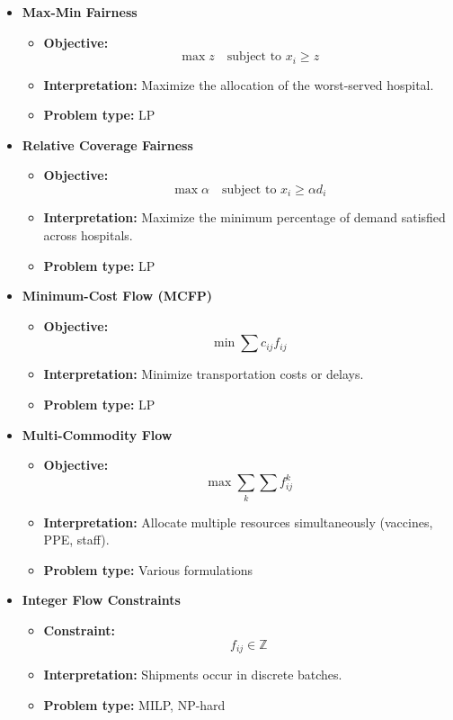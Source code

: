\documentclass[12pt, openany]{article}
\begin{document}
\begin{itemize}
\item \textbf{Max-Min Fairness}
\begin{itemize}
\item \textbf{Objective:}
\[
\max z \quad \text{subject to } x_i \ge z
\]
\item \textbf{Interpretation:} Maximize the allocation of the worst-served hospital.
\item \textbf{Problem type:} LP
\end{itemize}

\item \textbf{Relative Coverage Fairness}
\begin{itemize}
\item \textbf{Objective:}
\[
\max \alpha \quad \text{subject to } x_i \ge \alpha d_i
\]
\item \textbf{Interpretation:} Maximize the minimum percentage of demand satisfied across hospitals.
\item \textbf{Problem type:} LP
\end{itemize}

\item \textbf{Minimum-Cost Flow (MCFP)}
\begin{itemize}
\item \textbf{Objective:}
\[
\min \sum c_{ij} f_{ij}
\]
\item \textbf{Interpretation:} Minimize transportation costs or delays.
\item \textbf{Problem type:} LP
\end{itemize}

\item \textbf{Multi-Commodity Flow}
\begin{itemize}
\item \textbf{Objective:}
\[
\max \sum_k \sum f_{ij}^k
\]
\item \textbf{Interpretation:} Allocate multiple resources simultaneously (vaccines, PPE, staff).
\item \textbf{Problem type:} Various formulations
\end{itemize}

\item \textbf{Integer Flow Constraints}
\begin{itemize}
\item \textbf{Constraint:}
\[
f_{ij} \in \mathbb{Z}
\]
\item \textbf{Interpretation:} Shipments occur in discrete batches.
\item \textbf{Problem type:} MILP, NP-hard
\end{itemize}


\end{itemize}
\end{document}
